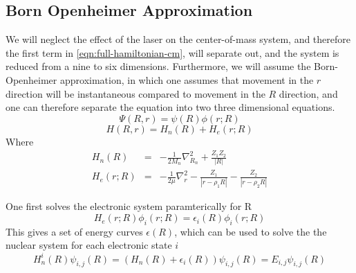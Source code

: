 \documentclass[a4paper]{article}
\begin{document}
\subsection{Born Openheimer Approximation}
We will neglect the effect of the laser on the center-of-mass system, and therefore the first term in \ref{eqn:full-hamiltonian-cm}, will separate out, and the system is reduced from a nine to six dimensions. Furthermore, we will assume the Born-Openheimer approximation, in which one assumes that movement in the $r$ direction will be instantaneous compared to movement in the $R$ direction, and one can therefore separate the equation into two three dimensional equations.
\begin{equation}
	\Psi(R, r) = \psi(R) \phi(r; R)
\end{equation}
\begin{equation}
	H(R, r) = H_n(R) + H_e(r; R)
\end{equation}
Where
\begin{eqnarray}
	H_n(R) &=& - \frac{1}{2 M_n} \nabla^2_{R_n} + \frac{Z_1 Z_2}{|R|} \\
	H_e(r; R) &=&  - \frac{1}{2 \mu} \nabla^2_{r} - \frac{Z_1}{|r - \rho_1 R|} - \frac{Z_2}{|r - \rho_2 R|}
\end{eqnarray}

One first solves the electronic system paramterically for R
\begin{equation}
	\label{eqn:electron-hamiltonian-bo}
	H_e(r; R) \phi_i(r; R) = \epsilon_i(R) \phi_i(r; R)
\end{equation}
This gives a set of energy curves $\epsilon(R)$, which can be used to solve the the nuclear system
for each electronic state $i$
\begin{equation}
	\label{eqn:nuclear-hamiltonian-bo}
 	H_n^i(R) \psi_{i,j}(R) = \left( H_n(R) + \epsilon_i(R) \right) \psi_{i,j}(R) = E_{i,j} \psi_{i,j}(R)
\end{equation}
\end{document}
